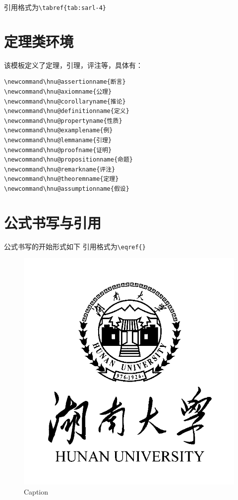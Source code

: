 引用格式为\lstinline!\tabref{tab:sarl-4}!

\section{定理类环境}
该模板定义了定理，引理，评注等，具体有：
\begin{lstlisting}
\newcommand\hnu@assertionname{断言}
\newcommand\hnu@axiomname{公理}
\newcommand\hnu@corollaryname{推论}
\newcommand\hnu@definitionname{定义}
\newcommand\hnu@propertyname{性质}
\newcommand\hnu@examplename{例}
\newcommand\hnu@lemmaname{引理}
\newcommand\hnu@proofname{证明}
\newcommand\hnu@propositionname{命题}
\newcommand\hnu@remarkname{评注}
\newcommand\hnu@theoremname{定理}
\newcommand\hnu@assumptionname{假设}
\end{lstlisting}

\section{公式书写与引用}
公式书写的开始形式如下
引用格式为\lstinline!\eqref{}!

\begin{figure}
    \centering
    \includegraphics{HNU_DoctoralThesis_Latex/figures/hnu-logo.png}
    \caption{Caption}
    \label{fig:1}
\end{figure}

